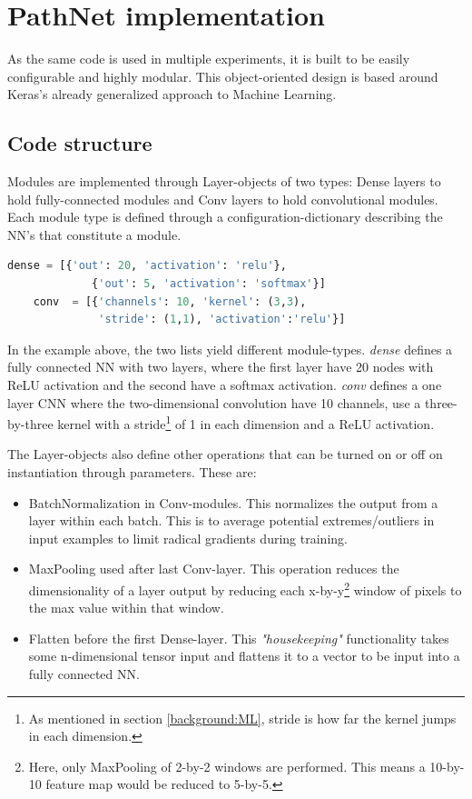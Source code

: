 \section{PathNet implementation}
As the same code is used in multiple experiments, it is built to be easily configurable and highly modular. This object-oriented design is based around Keras's already generalized approach to Machine Learning.

\subsection{Code structure}
Modules are implemented through Layer-objects of two types: Dense layers to hold fully-connected modules and Conv layers to hold convolutional modules. Each module type is defined through a configuration-dictionary describing the NN's that constitute a module. 

\begin{lstlisting}[language=Python]
    dense = [{'out': 20, 'activation': 'relu'}, 
             {'out': 5, 'activation': 'softmax'}]
    conv  = [{'channels': 10, 'kernel': (3,3), 
              'stride': (1,1), 'activation':'relu'}]
\end{lstlisting}
In the example above, the two lists yield different module-types. \textit{dense} defines a fully connected NN with two layers, where the first layer have 20 nodes with ReLU activation and the second have a softmax activation. \textit{conv} defines a one layer CNN where the two-dimensional convolution have 10 channels, use a three-by-three kernel with a stride\footnote{As mentioned in section \ref{background:ML}, stride is how far the kernel jumps in each dimension.} of 1 in each dimension and a ReLU activation.

The Layer-objects also define other operations that can be turned on or off on instantiation through parameters. These are:
\begin{itemize}
    \item BatchNormalization\cite{batchnorm} in Conv-modules. This normalizes the output from a layer within each batch. This is to average potential extremes/outliers in input examples to limit radical gradients during training.
    \item MaxPooling used after last Conv-layer. This operation reduces the dimensionality of a layer output by reducing each x-by-y\footnote{Here, only MaxPooling of 2-by-2 windows are performed. This means a 10-by-10 feature map would be reduced to 5-by-5.} window of pixels to the max value within that window.
    \item Flatten before the first Dense-layer. This \textit{"housekeeping"} functionality takes some n-dimensional tensor input and flattens it to a vector to be input into a fully connected NN.  
\end{itemize}


